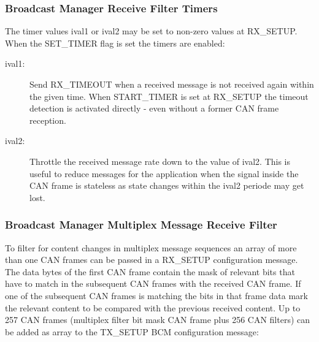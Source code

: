 \documentclass[a4paper,8pt,english]{sphinxmanual}
\begin{document}
\subsubsection{Broadcast Manager Receive Filter Timers}
\label{networking/can:broadcast-manager-receive-filter-timers}
The timer values ival1 or ival2 may be set to non-zero values at RX\_SETUP.
When the SET\_TIMER flag is set the timers are enabled:
\begin{description}
\item[{ival1:}] \leavevmode
Send RX\_TIMEOUT when a received message is not received again within
the given time. When START\_TIMER is set at RX\_SETUP the timeout detection
is activated directly - even without a former CAN frame reception.

\item[{ival2:}] \leavevmode
Throttle the received message rate down to the value of ival2. This
is useful to reduce messages for the application when the signal inside the
CAN frame is stateless as state changes within the ival2 periode may get
lost.

\end{description}


\subsubsection{Broadcast Manager Multiplex Message Receive Filter}
\label{networking/can:broadcast-manager-multiplex-message-receive-filter}
To filter for content changes in multiplex message sequences an array of more
than one CAN frames can be passed in a RX\_SETUP configuration message. The
data bytes of the first CAN frame contain the mask of relevant bits that
have to match in the subsequent CAN frames with the received CAN frame.
If one of the subsequent CAN frames is matching the bits in that frame data
mark the relevant content to be compared with the previous received content.
Up to 257 CAN frames (multiplex filter bit mask CAN frame plus 256 CAN
filters) can be added as array to the TX\_SETUP BCM configuration message:
\end{document}
